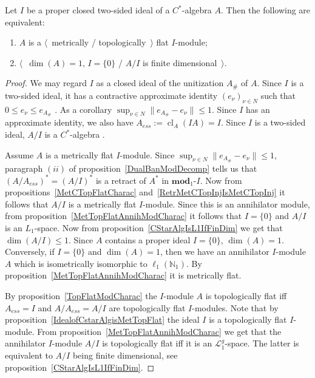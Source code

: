 \begin{proposition}\label{CStarAlgIsTopFlatOverItsIdeal} Let $I$ be a proper
closed two-sided ideal of a  $C^*$-algebra $A$. Then the following are equivalent:

\begin{enumerate}[label = (\roman*)]
    \item $A$ is a $\langle$~metrically / topologically~$\rangle$ flat $I$-module;

    \item $\langle$~$\operatorname{dim}(A)=1$, $I= \{0 \}$ / $A/I$ is finite
    dimensional~$\rangle$.
\end{enumerate}
\end{proposition}
\begin{proof} We may regard $I$ as a closed  ideal of the unitization $A_\#$ of $A$. Since
$I$ is a two-sided ideal, it has a contractive approximate identity
${(e_\nu)}_{\nu\in N}$ such that $0\leq e_\nu\leq e_{A_\#}$
\cite[theorem 4.7.79]{HelBanLocConvAlg}. As a 
corollary $\sup_{\nu\in N}\lVert e_{A_\#}-e_\nu\rVert\leq 1$. Since $I$ has an 
approximate identity, we also have $A_{ess}:=\operatorname{cl}_A(IA)=I$. 
Since $I$ is a two-sided ideal, $A/I$ is a $C^*$-algebra 
\cite[theorem 4.7.81]{HelBanLocConvAlg}.

Assume $A$ is a metrically flat $I$-module. Since 
$\sup_{\nu\in N}\lVert e_{A_\#}-e_\nu\rVert\leq 1$, paragraph $(ii)$ of
proposition~\ref{DualBanModDecomp} tells us that ${(A/A_{ess})}^*={(A/I)}^*$ is 
a retract of $A^*$ in $\mathbf{mod}_1\text{-}I$. Now from
propositions~\ref{MetCTopFlatCharac} and~\ref{RetrMetCTopInjIsMetCTopInj} it
follows that $A/I$ is a metrically flat $I$-module. Since this is an annihilator
module, from proposition~\ref{MetTopFlatAnnihModCharac} it follows that 
$I= \{0 \}$ and $A/I$ is an $L_1$-space. Now from
proposition~\ref{CStarAlgIsL1IfFinDim} we get that 
$\operatorname{dim}(A/I)\leq 1$. Since $A$ contains a proper 
ideal $I= \{0 \}$, $\operatorname{dim}(A)=1$. Conversely, 
if $I= \{0 \}$ and $\operatorname{dim}(A)=1$, then we have an 
annihilator $I$-module $A$ which is isometrically isomorphic 
to $\ell_1(\mathbb{N}_1)$. By proposition~\ref{MetTopFlatAnnihModCharac} 
it is metrically flat. 

By proposition~\ref{TopFlatModCharac} the $I$-module $A$ is topologically flat
iff $A_{ess}=I$ and $A/A_{ess}=A/I$ are topologically flat $I$-modules. Note that by
proposition~\ref{IdealofCstarAlgisMetTopFlat} the ideal $I$ is a topologically
flat $I$-module. From proposition~\ref{MetTopFlatAnnihModCharac} we get that the 
annihilator $I$-module $A/I$ is topologically flat iff it is an $\mathscr{L}_1^g$-space. 
The latter is equivalent to $A/I$ being finite dimensional, see 
proposition~\ref{CStarAlgIsL1IfFinDim}.
\end{proof}

